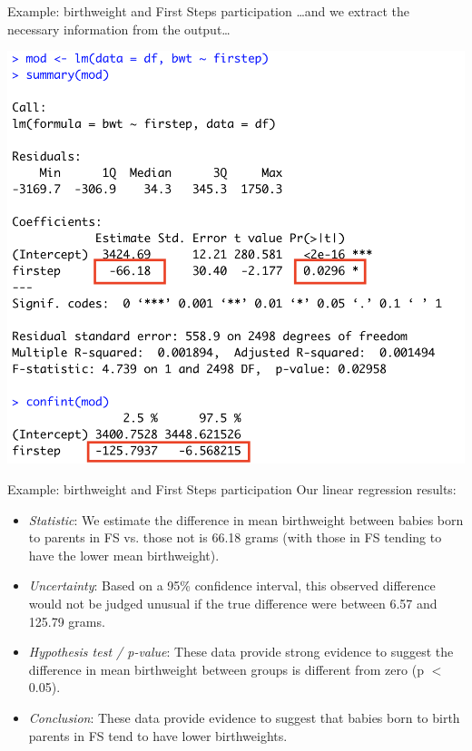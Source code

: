 \documentclass[10pt,t]{beamer}
\begin{document}
\begin{frame}{Example: birthweight and First Steps participation}
\dots and we extract the necessary information from the output\dots

\vspace{0.2cm}

\centering \includegraphics[scale=0.35]{figures/lm_bwt_fs2.png}
\end{frame}

\begin{frame}{Example: birthweight and First Steps participation}
Our linear regression results:

\vspace{0.3cm}

\begin{itemize}
	\item \textit{Statistic}: We estimate the difference in mean birthweight between babies born to parents in FS vs. those not is 66.18 grams (with those in FS tending to have the lower mean birthweight). \pause
	\item \textit{Uncertainty}: Based on a 95\% confidence interval, this observed difference would not be judged unusual if the true difference were between 6.57 and 125.79 grams. \pause
	\item \textit{Hypothesis test / p-value}: These data provide strong evidence to suggest the difference in mean birthweight between groups is different from zero (p $<$ 0.05). \pause
	\item \textit{Conclusion}: These data provide evidence to suggest that babies born to birth parents in FS tend to have lower birthweights.
\end{itemize}
\end{frame}
\end{document}
